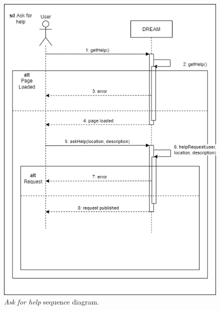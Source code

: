 \begin{figure}[H]
    \centering
    \includegraphics[width=\linewidth]{Images/Use Case/UC6.png}
    \caption{\textit{Ask for help} sequence diagram.}
\end{figure}
\newpage

